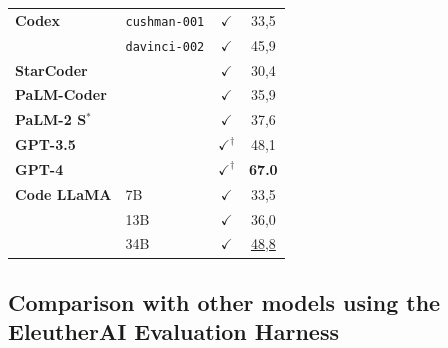 \documentclass{article}
\begin{document}
\begin{table}[t]
\begin{tabular}{llcc}
\textbf{Codex}             & \texttt{cushman-001} & $\checkmark$                   & 33,5               \\
                           & \texttt{davinci-002} & $\checkmark$                   & 45,9               \\
\textbf{StarCoder}         &             & $\checkmark$                   & 30,4               \\
\textbf{PaLM-Coder}        &             & $\checkmark$                   & 35,9               \\
\textbf{PaLM-2 S$^*$}      &             & $\checkmark$                   & 37,6               \\
\textbf{GPT-3.5} &             & $\checkmark^\dagger$                 & 48,1               \\
\textbf{GPT-4} &             & $\checkmark^\dagger$                 & \textbf{67.0}               \\
\textbf{Code LLaMA}         & 7B          & $\checkmark$                   & 33,5               \\
                           & 13B         & $\checkmark$                   & 36,0               \\
                           & 34B         & $\checkmark$                   & \underline{48,8}               \\ \bottomrule

\end{tabular}
\end{table}

\subsection{Comparison with other models using the EleutherAI Evaluation Harness}
\label{sec:eai}
\end{document}
